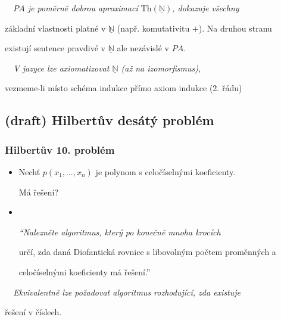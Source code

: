     {\it {}\ \ $PA$ je poměrně dobrou aproximací $\mathrm{Th}(\underline{\mathbb{N}})$, dokazuje všechny
    \smallskip
    
    základní vlastnosti platné v $\underline{\mathbb{N}}$ (např. komutativitu $+$). Na druhou stranu
    \smallskip
    
    existují sentence pravdivé v $\underline{\mathbb{N}}$ ale nezávislé v $PA$.}
    \bigskip
    
    {\it {}\ \ V jazyce  lze axiomatizovat $\underline{\mathbb{N}}$ (až na izomorfismus),
    \smallskip
    
    vezmeme-li místo schéma indukce přímo axiom indukce (2. řádu)}
    
    
    
    

\subsection{(draft) Hilbertův desátý problém}\todo

\subsubsection*{Hilbertův 10. problém}
    \begin{itemize}
    \item Nechť $p(x_1,\dots,x_n)$ je polynom s celočíselnými koeficienty.
    \smallskip
    
    Má    řešení?
    \smallskip
    
    \item {}\ \ {\it ``Nalezněte algoritmus, který po konečně mnoha krocích
    \smallskip
    
    určí, zda daná Diofantická rovnice s libovolným počtem proměnných a
    \smallskip
    
    celočíselnými koeficienty má  řešení.''}
    \end{itemize}
    \smallskip
    
    {\it {}\ \ Ekvivalentně lze požadovat algoritmus rozhodující, zda existuje
    \smallskip
    
    řešení v  číslech.}
    \medskip
    
